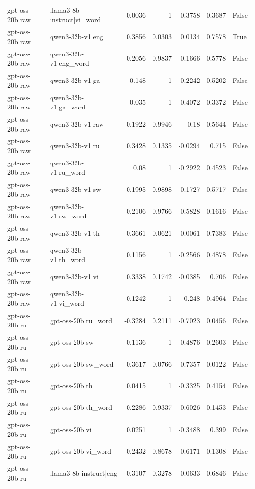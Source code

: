 \begin{table}
\begin{tabular}{l l r r r r l}
gpt-oss-20b|raw & llama3-8b-instruct|vi_word & -0.0036 & 1 & -0.3758 & 0.3687 & False \\
gpt-oss-20b|raw & qwen3-32b-v1|eng & 0.3856 & 0.0303 & 0.0134 & 0.7578 & True \\
gpt-oss-20b|raw & qwen3-32b-v1|eng_word & 0.2056 & 0.9837 & -0.1666 & 0.5778 & False \\
gpt-oss-20b|raw & qwen3-32b-v1|ga & 0.148 & 1 & -0.2242 & 0.5202 & False \\
gpt-oss-20b|raw & qwen3-32b-v1|ga_word & -0.035 & 1 & -0.4072 & 0.3372 & False \\
gpt-oss-20b|raw & qwen3-32b-v1|raw & 0.1922 & 0.9946 & -0.18 & 0.5644 & False \\
gpt-oss-20b|raw & qwen3-32b-v1|ru & 0.3428 & 0.1335 & -0.0294 & 0.715 & False \\
gpt-oss-20b|raw & qwen3-32b-v1|ru_word & 0.08 & 1 & -0.2922 & 0.4523 & False \\
gpt-oss-20b|raw & qwen3-32b-v1|sw & 0.1995 & 0.9898 & -0.1727 & 0.5717 & False \\
gpt-oss-20b|raw & qwen3-32b-v1|sw_word & -0.2106 & 0.9766 & -0.5828 & 0.1616 & False \\
gpt-oss-20b|raw & qwen3-32b-v1|th & 0.3661 & 0.0621 & -0.0061 & 0.7383 & False \\
gpt-oss-20b|raw & qwen3-32b-v1|th_word & 0.1156 & 1 & -0.2566 & 0.4878 & False \\
gpt-oss-20b|raw & qwen3-32b-v1|vi & 0.3338 & 0.1742 & -0.0385 & 0.706 & False \\
gpt-oss-20b|raw & qwen3-32b-v1|vi_word & 0.1242 & 1 & -0.248 & 0.4964 & False \\
gpt-oss-20b|ru & gpt-oss-20b|ru_word & -0.3284 & 0.2111 & -0.7023 & 0.0456 & False \\
gpt-oss-20b|ru & gpt-oss-20b|sw & -0.1136 & 1 & -0.4876 & 0.2603 & False \\
gpt-oss-20b|ru & gpt-oss-20b|sw_word & -0.3617 & 0.0766 & -0.7357 & 0.0122 & False \\
gpt-oss-20b|ru & gpt-oss-20b|th & 0.0415 & 1 & -0.3325 & 0.4154 & False \\
gpt-oss-20b|ru & gpt-oss-20b|th_word & -0.2286 & 0.9337 & -0.6026 & 0.1453 & False \\
gpt-oss-20b|ru & gpt-oss-20b|vi & 0.0251 & 1 & -0.3488 & 0.399 & False \\
gpt-oss-20b|ru & gpt-oss-20b|vi_word & -0.2432 & 0.8678 & -0.6171 & 0.1308 & False \\
gpt-oss-20b|ru & llama3-8b-instruct|eng & 0.3107 & 0.3278 & -0.0633 & 0.6846 & False \\

\end{tabular}
\end{table}
